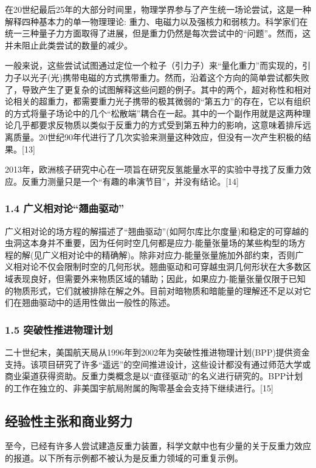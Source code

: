 在20世纪最后25年的大部分时间里，物理学界参与了产生统一场论尝试，这是一种解释四种基本力的单一物理理论: 重力、电磁力以及强核力和弱核力。科学家们在统一三种量子力方面取得了进展，但是重力仍然是每次尝试中的“问题”。然而，这并未阻止此类尝试的数量的减少。

一般来说，这些尝试试图通过定位一个粒子（引力子）来“量化重力”而实现的，引力子以光子(光)携带电磁的方式携带重力。然而，沿着这个方向的简单尝试都失败了，导致产生了更复杂的试图解释这些问题的例子。其中的两个，超对称性和相对论相关的超重力，都需要重力光子携带的极其微弱的“第五力”的存在，它以有组织的方式将量子场论中的几个“松散端”耦合在一起。其中的一个副作用就是这两种理论几乎都要求反物质以类似于反重力的方式受到第五种力的影响，这意味着排斥远离质量。20世纪90年代进行了几次实验来测量这种效应，但没有一次产生积极的结果。[13]

2013年，欧洲核子研究中心在一项旨在研究反氢能量水平的实验中寻找了反重力效应。反重力测量只是一个“有趣的串演节目”，并没有结论。[14]
\subsubsection{1.4 广义相对论“翘曲驱动”}
广义相对论的场方程的解描述了“翘曲驱动”(如阿尔库比尔度量)和稳定的可穿越的虫洞这本身并不重要，因为任何时空几何都是应力-能量张量场的某些构型的场方程的解(见广义相对论中的精确解)。除非对应力-能量张量施加外部约束，否则广义相对论不仅会限制时空的几何形状。翘曲驱动和可穿越虫洞几何形状在大多数区域表现良好，但需要外来物质区域的辅助；因此，如果应力-能量张量仅限于已知的物质形式，它们就被排除在解之外。目前对暗物质和暗能量的理解还不足以对它们在翘曲驱动中的适用性做出一般性的陈述。
\subsubsection{1.5 突破性推进物理计划}
二十世纪末，美国航天局从1996年到2002年为突破性推进物理计划(BPP)提供资金支持。该项目研究了许多“遥远”的空间推进设计，这些设计都没有通过师范大学或商业渠道获得资助。反重力类概念是以“直径驱动”的名义进行研究的。BPP计划的工作在独立的、非美国宇航局附属的陶零基金会支持下继续进行。[15]
\subsection{经验性主张和商业努力}
至今，已经有许多人尝试建造反重力装置，科学文献中也有少量的关于反重力效应的报道。以下所有示例都不被认为是反重力领域的可重复示例。